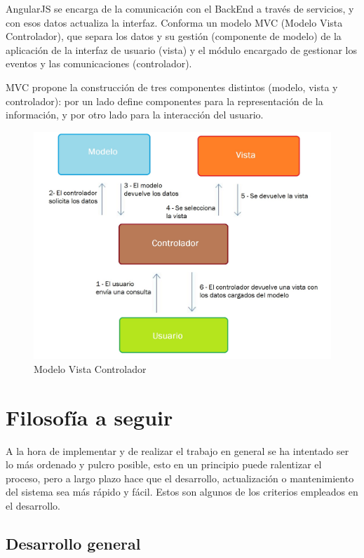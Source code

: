 \bigskip
AngularJS se encarga de la comunicación con el BackEnd a través de servicios, y con esos datos actualiza la interfaz. Conforma un modelo MVC (Modelo Vista Controlador), que separa los datos y su gestión (componente de modelo) de la aplicación de la interfaz de usuario (vista) y el módulo encargado de gestionar los eventos y las comunicaciones (controlador).

MVC propone la construcción de tres componentes distintos (modelo, vista y controlador): por un lado define componentes para la representación de la información, y por otro lado para la interacción del usuario. 

\bigskip
\begin{figure}[h]
	\centering
	\includegraphics[width=0.8\linewidth]{../images/mvc}
	\caption[Modelo Vista Controlador]{Modelo Vista Controlador}
	\label{fig:mvc}
\end{figure}



\newpage
\section{Filosofía a seguir}
\bigskip
A la hora de implementar y de realizar el trabajo en general se ha intentado ser lo más ordenado y pulcro posible, esto en un principio  puede ralentizar el proceso, pero a largo plazo hace que el desarrollo, actualización o mantenimiento del sistema sea más rápido y fácil. Estos son algunos de los criterios empleados en el desarrollo.

\bigskip
\subsection{Desarrollo general}
\bigskip

